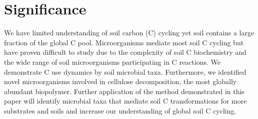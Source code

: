 \section{Significance} 
We have limited understanding of soil carbon (C) cycling yet soil contains
a large fraction of the global C pool. Microorganisms mediate most soil
C cycling but have proven difficult to study due to the complexity of soil
C biochemistry and the wide range of soil microorganisms participating in
C reactions. We demonstrate C use dynamics by soil microbial taxa. Furthermore,
we identified novel microorganisms involved in cellulose decomposition, the
most globally abundant biopolymer. Further application of the method
demonstrated in this paper will identify microbial taxa that mediate soil
C transformations for more substrates and soils and increase our understanding
of global soil C cycling. 

